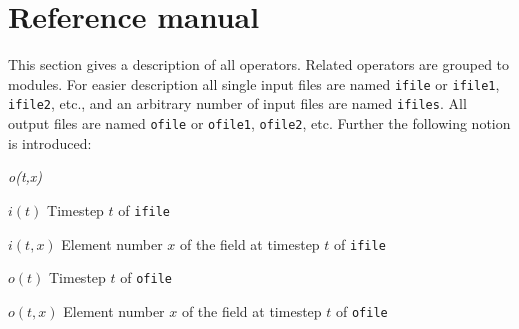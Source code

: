 \chapter{\label{refman}Reference manual}

This section gives a description of all operators. Related operators are grouped to modules.
For easier description all single input files are named \texttt{ifile} or \texttt{ifile1}, \texttt{ifile2}, etc.,
and an arbitrary number of input files are named \texttt{ifiles}.
All output files are named \texttt{ofile} or \texttt{ofile1}, \texttt{ofile2}, etc.
Further the following notion is introduced:
\begin{defalist}{{\em o(t,x)}}
\item[\(i(t)\)\hfill]
Timestep \(t\) of \texttt{ifile}
\item[\(i(t,x)\)\hfill]
Element number \(x\) of the field at timestep \(t\) of \texttt{ifile}
\item[\(o(t)\)\hfill]
Timestep \(t\) of \texttt{ofile}
\item[\(o(t,x)\)\hfill]
Element number \(x\) of the field at timestep \(t\) of \texttt{ofile}
\end{defalist}




